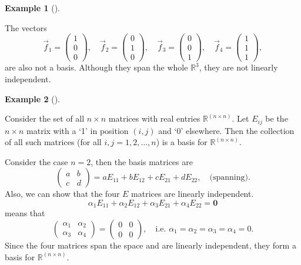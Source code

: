 \documentclass[
  a4paper,
  DIV=11,
  numbers=noendperiod,
  oneside]{scrreprt}
\theoremstyle{definition}
\newtheorem{example}{Example}[chapter]
\theoremstyle{remark}
\begin{document}
\begin{example}[]\protect\hypertarget{exm-}{}\label{exm-}

The vectors
\[\vec{f}_{1} =  \scriptscriptstyle \begin{pmatrix}   1\\ 0 \\ 0   \end{pmatrix} \textstyle, \quad \vec{f}_{2} =  \scriptscriptstyle \begin{pmatrix}   0\\ 1 \\ 0   \end{pmatrix} \textstyle, \quad \vec{f}_{3} =  \scriptscriptstyle \begin{pmatrix}   0\\ 0 \\ 1  \end{pmatrix} \textstyle, \quad  \vec{f}_{4} =  \scriptscriptstyle \begin{pmatrix}   1\\ 1 \\ 1   \end{pmatrix} \textstyle ,\]
are also not a basis. Although they span the whole \(\mathbb{R}^{3}\),
they are not linearly independent.

\end{example}

\begin{example}[]\protect\hypertarget{exm-}{}\label{exm-}

Consider the set of all \(n\times n\) matrices with real entries
\(\mathbb{R}^{(n\times n)}\). Let \(E_{ij}\) be the \(n\times n\) matrix
with a `1' in position \((i,j)\) and `0' elsewhere. Then the collection
of all such matrices (for all \(i,j=1,2,\ldots,n\)) is a basis for
\(\mathbb{R}^{(n\times n)}\).

Consider the case \(n=2\), then the basis matrices are
\[\left(\begin{array}{cc}
 a & b\\
 c & d
 \end{array}\right)=aE_{11}+bE_{12}+cE_{21}+dE_{22},\quad\textrm{(spanning)}.\]
Also, we can show that the four \(E\) matrices are linearly independent.
\[\alpha _{1}E_{11}+\alpha _{2}E_{12}+\alpha _{3}E_{21}+\alpha _{4}E_{22}=\mathbf{0}\]
means that \[\left(\begin{array}{cc}
 \alpha _{1} & \alpha _{2}\\
 \alpha _{3} & \alpha _{4}
 \end{array}\right) = \left(\begin{array}{cc}
 0 & 0\\
 0 & 0
 \end{array}\right),\quad\textrm{i.e.   }\alpha _{1}=\alpha _{2}=\alpha _{3}=\alpha _{4}=0.\]
Since the four matrices span the space and are linearly independent,
they form a basis for \(\mathbb{R}^{(n\times n)}\).

\end{example}
\end{document}
